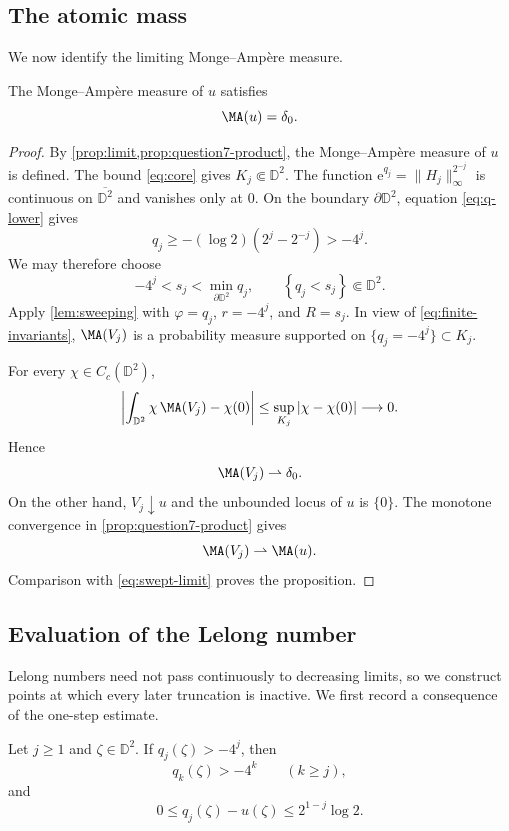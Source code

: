 \documentclass[11pt,a4paper]{article}
\newcommand{\e}{\mathrm e}
\begin{document}
\subsection{The atomic mass}

We now identify the limiting Monge--Amp\`ere measure.

\begin{proposition}\label{prop:mass}
The Monge--Amp\`ere measure of $u$ satisfies
\[
  \MA(u)=\delta_0.
\]
\end{proposition}

\begin{proof}
By \cref{prop:limit,prop:question7-product}, the Monge--Amp\`ere measure of $u$ is defined. The bound \eqref{eq:core} gives $K_j\Subset\mathbb D^2$.
The function $\e^{q_j}=\|H_j\|_\infty^{2^{-j}}$ is continuous on $\overline{\mathbb D^2}$ and vanishes only at $0$.
On the boundary $\partial \mathbb D^2$, equation \eqref{eq:q-lower} gives
\[
  q_j\ge-(\log 2)\left(2^j-2^{-j}\right)>-4^j.
\]
We may therefore choose
\[
  -4^j<s_j<\min_{\partial\mathbb D^2}q_j, \qquad \left\{q_j<s_j\right\}\Subset\mathbb D^2.
\]
Apply \cref{lem:sweeping} with $\varphi=q_j$, $r=-4^j$, and $R=s_j$. In view of \eqref{eq:finite-invariants}, $\MA(V_j)$ is a probability measure supported on $\{q_j=-4^j\}\subset K_j$.

For every $\chi\in C_c(\mathbb D^2)$,
\[
  \left|\int_{\mathbb D^2}\chi\,\MA(V_j)-\chi(0)\right|\le\sup_{K_j}\left|\chi-\chi(0)\right| \longrightarrow 0.
\]
Hence
\begin{equation}\label{eq:swept-limit}
  \MA(V_j)\rightharpoonup\delta_0.
\end{equation}
On the other hand, $V_j\downarrow u$ and the unbounded locus of $u$ is $\{0\}$. The monotone convergence in \cref{prop:question7-product} gives
\[
  \MA(V_j)\rightharpoonup\MA(u).
\]
Comparison with \eqref{eq:swept-limit} proves the proposition.
\end{proof}

\subsection{Evaluation of the Lelong number}\label{sec:lelong}

Lelong numbers need not pass continuously to decreasing limits, so we construct points at which every later truncation is inactive. We first record a consequence of the one-step estimate.

\begin{lemma}\label{lem:untruncated-region}
Let $j\ge1$ and $\zeta\in\mathbb D^2$.
If $q_j(\zeta)>-4^j$, then
\begin{equation}\label{eq:inactive-cutoffs}
  q_k(\zeta)>-4^k
  \qquad(k\ge j),
\end{equation}
and
\begin{equation}\label{eq:tail-bound}
  0\le q_j(\zeta)-u(\zeta)\le2^{1-j}\log 2.
\end{equation}
\end{lemma}
\end{document}
